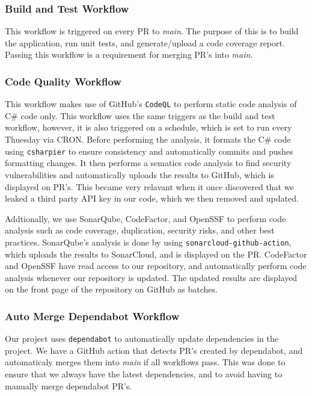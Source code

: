 \subsubsection{Build and Test Workflow}
This workflow is triggered on every PR to \textit{main}.
The purpose of this is to build the application, run unit tests, 
and generate/upload a code coverage report.
Passing this workflow is a requirement for merging PR's into \textit{main}.

\subsubsection{Code Quality Workflow}
This workflow makes use of GitHub's \texttt{CodeQL} to perform static code analysis 
of C\# code only.
This workflow uses the same triggers as the build and test workflow, however, 
it is also triggered on a schedule, which is set to run every Thuesday via CRON.
Before performing the analysis, it formats the C\# code using \texttt{csharpier} to 
ensure consistency and automatically commits and pushes formatting changes.
It then performs a sematics code analysis to find security vulnerabilities and 
automatically uploads the results to GitHub, which is displayed on PR's.
This became very relavant when it once discovered that we leaked a third party 
API key in our code, which we then removed and updated.

Addtionally, we use SonarQube, CodeFactor, and OpenSSF to perform code analysis 
such as code coverage, duplication, security risks, and other best practices.
SonarQube's analysis is done by using \texttt{sonarcloud-github-action}, which 
uploads the results to SonarCloud, and is displayed on the PR.
CodeFactor and OpenSSF have read access to our repository, and automatically 
perform code analysis whenever our repository is updated.
The updated results are displayed on the front page of the repository on GitHub as batches.

\subsubsection{Auto Merge Dependabot Workflow}
Our project uses \texttt{dependabot} to automatically update dependencies in the project.
We have a GitHub action that detects PR's created by dependabot, and automaticaly merges 
them into \textit{main} if all workflows pass.
This was done to ensure that we always have the latest dependencies,
and to avoid having to manually merge dependabot PR's.

